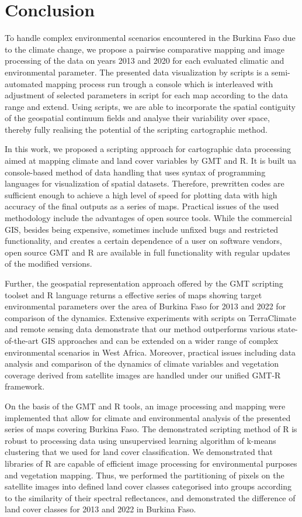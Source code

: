 \documentclass[knowledge,article,submit,pdftex,moreauthors]{Definitions/mdpi}
\begin{document}
\section{Conclusion}
To handle complex environmental scenarios encountered in the Burkina Faso due to the climate change, we propose a pairwise comparative mapping and image processing of the data on years 2013 and 2020 for each evaluated climatic and environmental parameter. The presented data visualization by scripts is a semi-automated mapping process run trough a console which is interleaved with adjustment of selected parameters in script for each map according to the data range and extend. Using scripts, we are able to incorporate the spatial contiguity of the geospatial continuum fields and analyse their variability over space, thereby fully realising the potential of the scripting cartographic method. 

In this work, we proposed a scripting approach for cartographic data processing aimed at mapping climate and land cover variables by GMT and R. It is built ua console-based method of data handling that uses syntax of programming languages for visualization of spatial datasets. Therefore, prewritten codes are sufficient enough to achieve a high level of speed for plotting data with high accuracy of the final outputs as a series of maps. Practical issues of the used methodology include the advantages of open source tools. While the commercial GIS, besides being expensive, sometimes include unfixed bugs and restricted functionality, and creates a certain dependence of a user on software vendors, open source GMT and R are available in full functionality with regular updates of the modified versions. 

Further, the geospatial representation approach offered by the GMT scripting toolset and R language returns a effective series of maps showing target environmental parameters over the area of Burkina Faso for 2013 and 2022 for comparison of the dynamics. Extensive experiments with scripts on TerraClimate and remote sensing data demonstrate that our method outperforms various state-of-the-art GIS approaches and can be extended on a wider range of complex environmental scenarios in West Africa. Moreover, practical issues including data analysis and comparison of the dynamics of climate variables  and vegetation coverage derived from satellite images are handled under our unified GMT-R framework.

On the basis of the GMT and R tools, an image processing and mapping were implemented that allow for climate and environmental analysis of the presented series of maps covering Burkina Faso. The demonstrated scripting method of R is robust to processing data using unsupervised learning algorithm of k-means clustering that we used for land cover classification. We demonstrated that libraries of R are capable of efficient image processing for environmental purposes and vegetation mapping. Thus, we performed the partitioning of pixels on the satellite images into defined land cover classes categorised into groups according to the similarity of their spectral reflectances, and demonstrated the difference of land cover classes for 2013 and 2022 in Burkina Faso.
\end{document}
